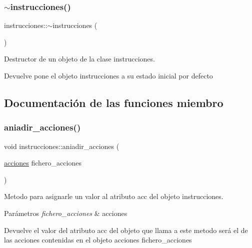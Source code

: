 \subsubsection{\texorpdfstring{$\sim$instrucciones()}{~instrucciones()}}
{\footnotesize\ttfamily instrucciones\+::$\sim$instrucciones (\begin{DoxyParamCaption}{ }\end{DoxyParamCaption})}



Destructor de un objeto de la clase instrucciones. 

\begin{DoxyReturn}{Devuelve}
pone el objeto instrucciones a su estado inicial por defecto 
\end{DoxyReturn}


\subsection{Documentación de las funciones miembro}
\mbox{\label{classinstrucciones_a203c471e9106613471a7a085c4badd47}} 
\subsubsection{\texorpdfstring{aniadir\+\_\+acciones()}{aniadir\_acciones()}}
{\footnotesize\ttfamily void instrucciones\+::aniadir\+\_\+acciones (\begin{DoxyParamCaption}\item[{\hyperlink{classacciones}{acciones}}]{fichero\+\_\+acciones }\end{DoxyParamCaption})}



Metodo para asignarle un valor al atributo acc del objeto instrucciones. 


\begin{DoxyParams}{Parámetros}
{\em fichero\+\_\+acciones} & acciones \\
\hline
\end{DoxyParams}
\begin{DoxyReturn}{Devuelve}
el valor del atributo acc del objeto que llama a este metodo será el de las acciones contenidas en el objeto acciones fichero\+\_\+acciones 
\end{DoxyReturn}
\mbox{\label{classinstrucciones_a06dafbbba27a1bc71f67451d5b183b85}} 
